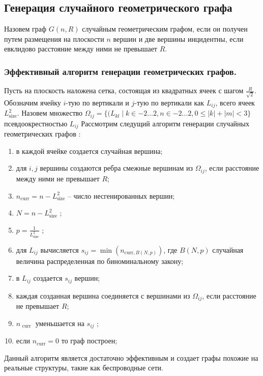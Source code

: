 \subsection{Генерация случайного геометрического графа}
Назовем граф $G(n,R)$ случайным геометрическим 
графом, если он получен путем размещения
на плоскости  $n$ вершин и две вершины
инцидентны, если евклидово расстояние между ними не превышает  $R$.
\subsubsection{Эффективный алгоритм генерации геометрических графов.}

 Пусть на 
плоскость наложена сетка, состоящая из 
квадратных ячеек с шагом  $\frac{R}{\sqrt{2} }$. Обозначим 
ячейку  $i$-тую по вертикали и  $j$-тую по вертикали как $L_{ij}$,
всего ячеек $L_{\text{size}}^2$. Назовем множество 
$\Omega_{ij} = \{(L_{kl} \mid  k \in -2 \dots 2, n \in -2 \dots 2 , 
0 \le  |k| + |m| < 3\}$ псевдоокрестностью $L_{ij}$
Рассмотрим следущий алгоритм генерации случайных
геометрических графов :
\begin{enumerate}
    \item в каждой ячейке создается случайная вершина;
    \item для $i,j$ вершины создаются ребра смежные
        вершинам из  $\Omega_{ij}$, если расстояние между ними не превышает $R$;
    \item  $n_{\text{curr}} = n - L^2_{\text{size}}$ -- число несгенированных вершин;
    \item $N = n - L^2_{\text{size}}$ ;
    \item $p = \frac{1}{L^2_{\text{size}}}$ ;
    \item для $L_{ij}$ вычисляется $s_{ij} = \min(n_{\text{curr},B(N,p)})$, где $B(N,p)$ случайная величина распределенная по 
        биноминальному закону;
    \item в $L_{ij}$ создается $s_{ij}$ вершин;
    \item каждая созданная вершина соединяется с вершинами из
        $\Omega_{ij}$, если расстояние не превышает $R$;
    \item  $n_{\text{ curr }}$ уменьшается на $s_{ij}$ ;
    \item если $n_{\text{curr}} = 0$ то граф построен;
\end{enumerate}
Данный алгоритм является достаточно эффективным и
создает графы похожие на реальные структуры, такие 
как беспроводные сети.
